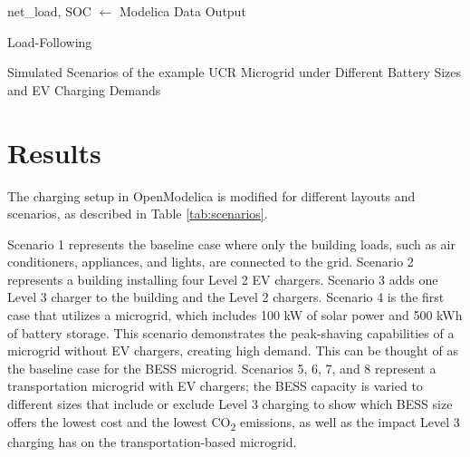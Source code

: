 \documentclass[conference, usletter]{IEEEtran}
\begin{document}
\begin{algorithm}
net\_load, SOC $\gets$ Modelica Data Output \\
\caption{Load-Following}
\label{alg:peakshavingflatrate}
\end{algorithm}
\begin{table}
\caption{Simulated Scenarios of the example UCR Microgrid under Different Battery Sizes and EV Charging Demands}

\normalsize
\label{tab:scenarios}
\end{table}
\section{Results}
The charging setup in OpenModelica is modified for different layouts and scenarios, as described in Table \ref{tab:scenarios}.

Scenario 1 represents the baseline case where only the building loads, such as air conditioners, appliances, and lights, are connected to the grid. Scenario 2 represents a building installing four Level 2 EV chargers. Scenario 3 adds one Level 3 charger to the building and the Level 2 chargers. Scenario 4 is the first case that utilizes a microgrid, which includes 100 kW of solar power and 500 kWh of battery storage. This scenario demonstrates the peak-shaving capabilities of a microgrid without EV chargers, creating high demand. This can be thought of as the baseline case for the BESS microgrid. Scenarios 5, 6, 7, and 8 represent a transportation microgrid with EV chargers; the BESS capacity is varied to different sizes that include or exclude Level 3 charging to show which BESS size offers the lowest cost and the lowest CO\textsubscript{2} emissions, as well as the impact Level 3 charging has on the transportation-based microgrid.
\end{document}
